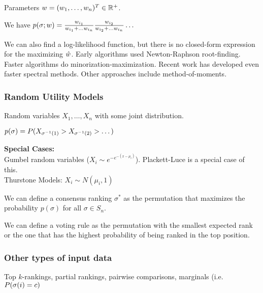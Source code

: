 \documentclass[twoside]{article}
\begin{document}
Parameters $\boldmath{w} = (w_1,\dots,w_n)^T \in \mathbb{R}^+$.

We have $p(\sigma;\boldmath{w}) = \frac{w_{i_1}}{w_{i_1} + \dots w_{i_n}} \frac{w_{i_2}}{w_{i_2} + \dots w_{i_n}} \dots$

We can also find a log-likelihood function, but there is no closed-form expression for the maximizing $\boldmath{\hat{w}}$.  Early algorithms used Newton-Raphson root-finding.  Faster algorithms do minorization-maximization.  Recent work has developed even faster spectral methods. Other approaches include method-of-moments.

\subsubsection*{Random Utility Models}

Random variables $X_1,\dots,X_n$ with some joint distribution.

$p(\sigma) = \boldmath{P}(X_{\sigma^{-1}(1)} > X_{\sigma^{-1}(2)} > \dots)$


\textbf{Special Cases:} \\
Gumbel random variables ($X_i \sim e^{-e^{-(x-\mu_i)}}$).  Plackett-Luce is a special case of this.\\
Thurstone Models: $X_i \sim N(\mu_i,1)$




We can define a consensus ranking $\sigma^*$ as the permutation that maximizes the probability $p(\sigma)$ for all $\sigma\in S_n$.

We can define a voting rule as the permutation with the smallest expected rank or the one that has the highest probability of being ranked in the top position.

\subsubsection{Other types of input data}

Top $k$-rankings, partial rankings, pairwise comparisons, marginals (i.e. $\boldmath{P}(\sigma(i) = c)$
\end{document}
